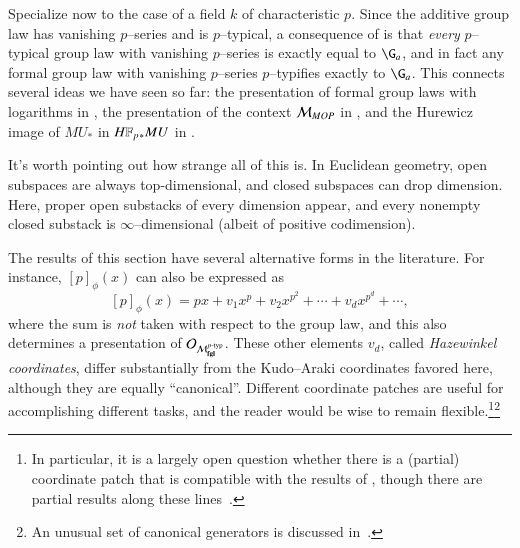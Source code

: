 \begin{remark}
Specialize now to the case of a field $k$ of characteristic $p$.  Since the additive group law has vanishing $p$--series and is $p$--typical, a consequence of  is that \emph{every} $p$--typical group law with vanishing $p$--series is exactly equal to $\G_a$, and in fact any formal group law with vanishing $p$--series $p$--typifies exactly to $\G_a$.  This connects several ideas we have seen so far: the presentation of formal group laws with logarithms in , the presentation of the context $\mathcal{M}_{MOP}$ in , and the Hurewicz image of $MU_*$ in $\HFp_* MU$ in .
\end{remark}

\begin{remark}
It's worth pointing out how strange all of this is. In Euclidean geometry, open subspaces are always top-dimensional, and closed subspaces can drop dimension.  Here, proper open substacks of every dimension appear, and every nonempty closed substack is $\infty$--dimensional (albeit of positive codimension).
\end{remark}

\begin{remark}
The results of this section have several alternative forms in the literature.  For instance, $[p]_\phi(x)$ can also be expressed as \[[p]_\phi(x) = px + v_1 x^p + v_2 x^{p^2} + \cdots + v_d x^{p^d} + \cdots,\] where the sum is \emph{not} taken with respect to the group law, and this also determines a presentation of $\mathcal{O}_{\mathcal{M}_{\mathbf{fgl}}^{p\text{-}\mathrm{typ}}}$.  These other elements $v_d$, called \textit{Hazewinkel coordinates}, differ substantially from the Kudo--Araki coordinates favored here, although they are equally ``canonical''.  Different coordinate patches are useful for accomplishing different tasks, and the reader would be wise to remain flexible.\footnote{In particular, it is a largely open question whether there is a (partial) coordinate patch that is compatible with the results of , though there are partial results along these lines~\cite{JohnsonNoel,LawsonSecondaryPowerOps,LawsonNaumann,StricklandProductsOnModules}.}\footnote{An unusual set of canonical generators is discussed in~\cite[Section V.10]{LazardCFGs}.}
\end{remark}

